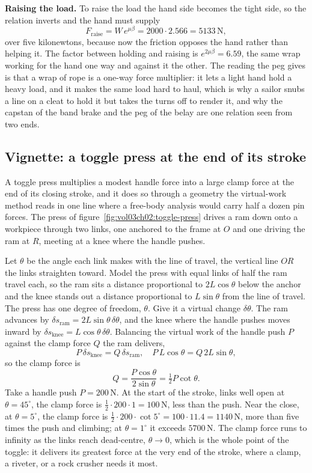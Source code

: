 \textbf{Raising the load.} To raise the load the hand side becomes the tight
side, so the relation inverts and the hand must supply
\[
F_{\text{raise}} = W\,e^{\mu\beta} = 2000 \cdot 2.566 = 5133\,\text{N},
\]
over five kilonewtons, because now the friction opposes the hand rather than
helping it. The factor between holding and raising is $e^{2\mu\beta} = 6.59$,
the same wrap working for the hand one way and against it the other. The reading
the peg gives is that a wrap of rope is a one-way force multiplier: it lets a
light hand hold a heavy load, and it makes the same load hard to haul, which is
why a sailor snubs a line on a cleat to hold it but takes the turns off to
render it, and why the capstan of the band brake and the peg of the belay are
one relation seen from two ends.

\subsection{Vignette: a toggle press at the end of its stroke}

A toggle press multiplies a modest handle force into a large clamp force at the
end of its closing stroke, and it does so through a geometry the virtual-work
method reads in one line where a free-body analysis would carry half a dozen pin
forces. The press of figure~\ref{fig:vol03ch02:toggle-press} drives a ram down
onto a workpiece through two links, one anchored to the frame at $O$ and one
driving the ram at $R$, meeting at a knee where the handle pushes.

Let $\theta$ be the angle each link makes with the line of travel, the vertical
line $OR$ the links straighten toward. Model the press with equal links of half
the ram travel each, so the ram sits a distance proportional to $2L\cos\theta$
below the anchor and the knee stands out a distance proportional to
$L\sin\theta$ from the line of travel. The press has one degree of freedom,
$\theta$. Give it a virtual change $\delta\theta$. The ram advances by
$\delta s_{\text{ram}} = 2L\sin\theta\,\delta\theta$, and the knee where the
handle pushes moves inward by $\delta s_{\text{knee}} =
L\cos\theta\,\delta\theta$. Balancing the virtual work of the handle push $P$
against the clamp force $Q$ the ram delivers,
\[
P\,\delta s_{\text{knee}} = Q\,\delta s_{\text{ram}}, \quad
P\,L\cos\theta = Q\,2L\sin\theta,
\]
so the clamp force is
\[
Q = \frac{P\cos\theta}{2\sin\theta} = \tfrac12 P\cot\theta.
\]
Take a handle push $P = 200\,\text{N}$. At the start of the stroke, links well
open at $\theta = 45^\circ$, the clamp force is $\tfrac12 \cdot 200 \cdot 1 =
100\,\text{N}$, less than the push. Near the close, at $\theta = 5^\circ$, the
clamp force is $\tfrac12 \cdot 200 \cdot \cot 5^\circ = 100 \cdot 11.4 =
1140\,\text{N}$, more than five times the push and climbing; at $\theta = 1^\circ$
it exceeds $5700\,\text{N}$. The clamp force runs to infinity as the links reach
dead-centre, $\theta \to 0$, which is the whole point of the toggle: it delivers
its greatest force at the very end of the stroke, where a clamp, a riveter, or a
rock crusher needs it most.

